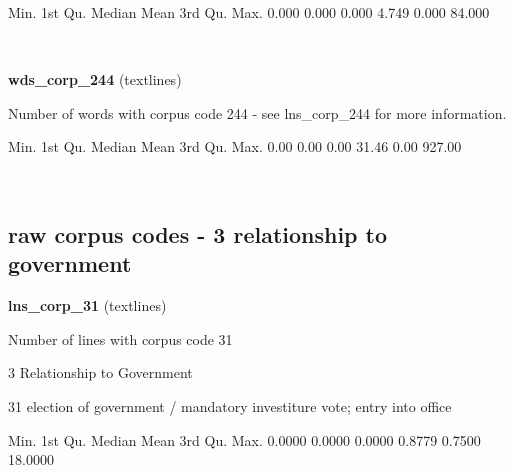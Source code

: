 \documentclass[]{article}
\newenvironment{Shaded}{\begin{snugshade}}{\end{snugshade}}
\newcommand{\FloatTok}[1]{\textcolor[rgb]{0.00,0.00,0.81}{{#1}}}
\newcommand{\NormalTok}[1]{{#1}}
\begin{document}
\begin{Shaded}
\begin{Highlighting}[]
   \NormalTok{Min. 1st Qu.  Median    Mean 3rd Qu.    Max. }
  \FloatTok{0.000}   \FloatTok{0.000}   \FloatTok{0.000}   \FloatTok{4.749}   \FloatTok{0.000}  \FloatTok{84.000} 
\end{Highlighting}
\end{Shaded}

~

\vspace{1em}

\textbf{wds\_corp\_244} (textlines)

Number of words with corpus code 244 - see lns\_corp\_244 for more
information.

\begin{Shaded}
\begin{Highlighting}[]
   \NormalTok{Min. 1st Qu.  Median    Mean 3rd Qu.    Max. }
   \FloatTok{0.00}    \FloatTok{0.00}    \FloatTok{0.00}   \FloatTok{31.46}    \FloatTok{0.00}  \FloatTok{927.00} 
\end{Highlighting}
\end{Shaded}

~

\vspace{1em}

\subsection{raw corpus codes - 3 relationship to
government}\label{raw-corpus-codes---3-relationship-to-government}

\textbf{lns\_corp\_31} (textlines)

Number of lines with corpus code 31

3 Relationship to Government

31 election of government / mandatory investiture vote; entry into
office

\begin{Shaded}
\begin{Highlighting}[]
   \NormalTok{Min. 1st Qu.  Median    Mean 3rd Qu.    Max. }
 \FloatTok{0.0000}  \FloatTok{0.0000}  \FloatTok{0.0000}  \FloatTok{0.8779}  \FloatTok{0.7500} \FloatTok{18.0000} 
\end{Highlighting}
\end{Shaded}

~

\vspace{1em}
\end{document}
